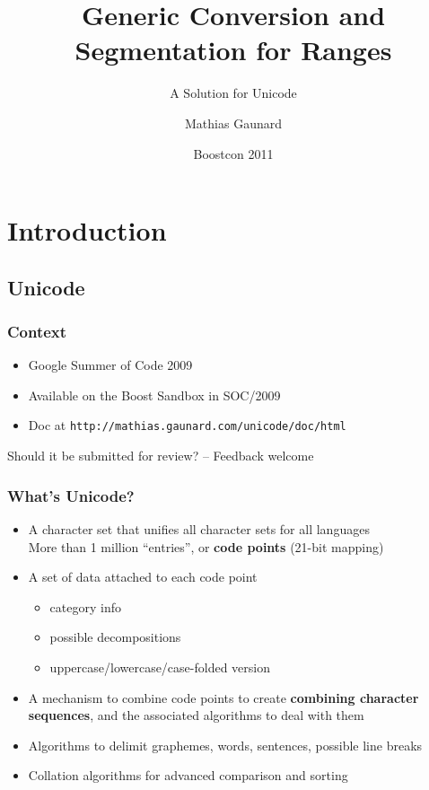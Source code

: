 \documentclass{beamer}
\title%
{Generic Conversion and Segmentation for Ranges}
\subtitle
{A Solution for Unicode}
\author%
{Mathias Gaunard}
\institute[MetaScale] %
{MetaScale Inc.}
\date%
{Boostcon 2011}
\begin{document}
\begin{frame}
\titlepage
\end{frame}

\section{Introduction}

\subsection{Unicode}

\begin{frame}
	\frametitle{Context}
	
	\begin{itemize}
		\item Google Summer of Code 2009
		\item Available on the Boost Sandbox in SOC/2009
		\item Doc at \lstinline{http://mathias.gaunard.com/unicode/doc/html}
	\end{itemize}
	\bigskip
	
	Should it be submitted for review? -- Feedback welcome
\end{frame}

\begin{frame}
	\frametitle{What's Unicode?}

	\begin{itemize}
		\item A character set that unifies all character sets for all languages\\
		      More than 1 million ``entries'', or \textbf{code points} (21-bit mapping)
		\item A set of data attached to each code point
		      \begin{itemize}
		      	\item category info
		      	\item possible decompositions
		      	\item uppercase/lowercase/case-folded version
		      \end{itemize}
		\item A mechanism to combine code points to create \textbf{combining character sequences},
		      and the associated algorithms to deal with them
		\item Algorithms to delimit graphemes, words, sentences, possible line breaks
		\item Collation algorithms for advanced comparison and sorting 
	\end{itemize}

\end{frame}
\end{document}
